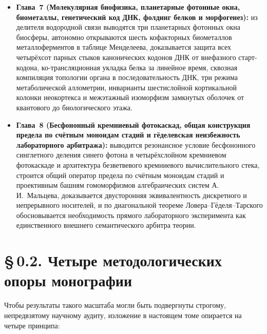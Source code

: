 \begin{itemize}[leftmargin=*,noitemsep]
\item \textbf{Глава~7 (Молекулярная биофизика, планетарные фотонные окна, биометаллы, генетический код ДНК, фолдинг белков и морфогенез):} из делителя водородной связи выводятся три планетарных фотонных окна биосферы, автономно открываются шесть кофакторных биометаллов металлоферментов в таблице Менделеева, доказывается защита всех четырёхсот парных стыков канонических кодонов ДНК от внефазного старт-кодона, ко-трансляционная укладка белка за линейное время, сквозная компиляция топологии органа в последовательность ДНК, три режима метаболической аллометрии, инварианты шестислойной кортикальной колонки неокортекса и межэтажный изоморфизм замкнутых оболочек от квантового до биологического этажа.
\item \textbf{Глава~8 (Бесфононный кремниевый фотокаскад, общая конструкция предела по счётным моноидам стадий и гёделевская неизбежность лабораторного арбитража):} выводится резонансное условие бесфононного синглетного деления синего фотона в четырёхслойном кремниевом фотокаскаде и архитектура безветвевого кремниевого вычислительного стека, строится общий оператор предела по счётным моноидам стадий и проективным башням гомоморфизмов алгебраических систем А.\,И.~Мальцева, доказывается двусторонняя эквивалентность дискретного и непрерывного носителей, и по диагональной теореме Ловера--Гёделя--Тарского обосновывается необходимость прямого лабораторного эксперимента как единственного внешнего семантического арбитра теории.
\end{itemize}

\section*{§\,0.2. Четыре методологических опоры монографии}

Чтобы результаты такого масштаба могли быть подвергнуты строгому, непредвзятому научному аудиту, изложение в настоящем томе опирается на четыре принципа:

